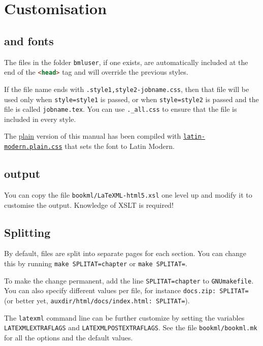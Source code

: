 \documentclass[a4paper,british]{article}
\def\htmlinline{\lstinline[language=html]}
\begin{document}
\section{Customisation}

\subsection{\CSS{} and fonts}
The \CSS{} files in the folder \lstinline|bmluser|, if one exists, are automatically included at the end of the \htmlinline|<head>| tag and will override the previous styles.

If the file name ends with \lstinline|.style1,style2-jobname.css|, then that file will be used only when \lstinline|style=style1| is passed, or when \lstinline|style=style2| is passed and the file is called \lstinline|jobname.tex|. You can use \lstinline|._all.css| to ensure that the file is included in every style.

The \href{https://vlmantova.github.io/bookml/index.plain.html}{plain} version of this manual has been compiled with \href{https://vlmantova.github.io/bookml/bmluser/latin-modern.plain.css}{\texttt{latin-modern.plain.css}} that sets the font to Latin Modern.

\subsection{\HTML{} output}

You can copy the file \texttt{bookml/LaTeXML-html5.xsl} one level up and modify it to customise the \HTML{} output. Knowledge of XSLT is required!

\subsection{Splitting}

By default, files are split into separate pages for each section. You can change this by running \lstinline|make SPLITAT=chapter| or \lstinline|make SPLITAT=|.

To make the change permanent, add the line \lstinline|SPLITAT=chapter| to \texttt{GNUmakefile}. You can also specify different values per file, for instance \lstinline|docs.zip: SPLITAT=| (or better yet, \lstinline|auxdir/html/docs/index.html: SPLITAT=|).

The \lstinline|latexml| command line can be further customize by setting the variables \lstinline|LATEXMLEXTRAFLAGS| and \lstinline|LATEXMLPOSTEXTRAFLAGS|. See the file \texttt{bookml/bookml.mk} for all the options and the default values.
\end{document}
